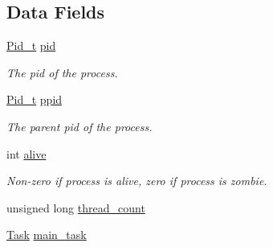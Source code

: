 \subsection*{Data Fields}
\begin{DoxyCompactItemize}
\item 
\hyperlink{group__syscalls_gafac07f3170763932fac97b6eab2c3984}{Pid\+\_\+t} \hyperlink{structprocinfo_a2e87cd5f0bdfe214832ec20f53deeb50}{pid}\hypertarget{structprocinfo_a2e87cd5f0bdfe214832ec20f53deeb50}{}\label{structprocinfo_a2e87cd5f0bdfe214832ec20f53deeb50}

\begin{DoxyCompactList}\small\item\em The pid of the process. \end{DoxyCompactList}\item 
\hyperlink{group__syscalls_gafac07f3170763932fac97b6eab2c3984}{Pid\+\_\+t} \hyperlink{structprocinfo_a790970c70987013b2712b7dd6d2b75b9}{ppid}
\begin{DoxyCompactList}\small\item\em The parent pid of the process. \end{DoxyCompactList}\item 
int \hyperlink{structprocinfo_a999dc5dbfee9902a9ea458944499efd3}{alive}\hypertarget{structprocinfo_a999dc5dbfee9902a9ea458944499efd3}{}\label{structprocinfo_a999dc5dbfee9902a9ea458944499efd3}

\begin{DoxyCompactList}\small\item\em Non-\/zero if process is alive, zero if process is zombie. \end{DoxyCompactList}\item 
unsigned long \hyperlink{structprocinfo_ae1ed3afa8904729a1daf1b51780cf2cf}{thread\+\_\+count}
\item 
\hyperlink{group__syscalls_gaec3f2f835e105271fbbc00272c0ba984}{Task} \hyperlink{structprocinfo_a4da339065f8780b37ab788f18ef9ed20}{main\+\_\+task}\hypertarget{structprocinfo_a4da339065f8780b37ab788f18ef9ed20}{}\label{structprocinfo_a4da339065f8780b37ab788f18ef9ed20}


\end{DoxyCompactItemize}
